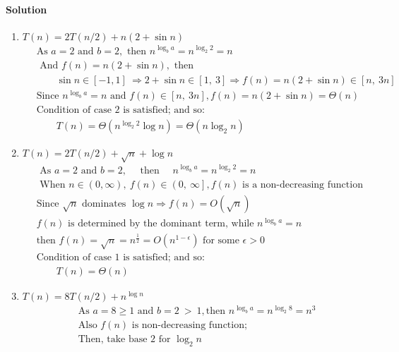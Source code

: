 \documentclass[a4paper]{scrartcl}
\begin{document}
\paragraph{Solution}
\begin{enumerate}[label=(\alph*)]
  \item $T (n) = 2T (n/2) + n(2 + \sin{n})$
\begin{align*}
  &\ \text{As }a = 2\text{ and }b = 2,\text{ then }n^{\log_b{a}} = n^{\log_2{2}} = n\\
  &\ \text{ And }f(n) = n(2 + \sin{n}),\text{ then}\\ &\
  \qquad \sin{n} \in \left[-1, 1\right]\ \Rightarrow 2+\sin{n} \in \left[1,\ 3\right] \Rightarrow f(n) = n\left(2 + \sin{n}\right) \in \left[n,\ 3n\right]\\ &\
  \text{Since }n^{\log_b{a}} = n\text{ and }f(n) \in \left[n,\ 3n\right], f(n) = n(2 + \sin{n}) = \Theta(n)\\ &\
  \text{Condition of case 2 is satisfied; and so:}\\
  &\ \qquad T(n)=\Theta\left({n^{\log_2{2}}\log{n}}\right) =\Theta\left({n\log_2{n}}\right)
\end{align*}
\item $T (n) = 2T (n/2) + \sqrt{n} + \log{n}$
\begin{align*}
  &\ \text{ As }a = 2\text{ and }b = 2,\quad\text{ then }\quad n^{\log_b{a}} = n^{\log_2{2}} = n\\
  &\ \text{ When }n \in \left(0, \infty\right),\ f(n) \in \left(0,\ \infty\right], f(n)\text{ is a non-decreasing function}\\
  &\ \text{Since }\sqrt{n}\text{ dominates }\log{n} \Rightarrow f(n)=O(\sqrt{n}) \\ &\ 
  f(n)\text{ is determined by the dominant term, while }n^{\log_b{a}}=n\\ &\
  \text{then }f(n) = \sqrt{n}=n^{\frac{1}{2}}=O(n^{1-\epsilon})\text{ for some } \epsilon > 0\\ &\
  \text{Condition of case 1 is satisfied; and so:}\\
  &\ \qquad T(n)=\Theta(n)
\end{align*}
\item $T (n) = 8T (n/2) + n^{\log{n}}$
\begin{align*}
  &\ \text{As }a = 8\geq 1\text{ and }b = 2\ >\ 1,\text{then }n^{\log_b{a}} = n^{\log_2{8}} = n^3\\ &\
  \text{Also }f(n)\text{ is non-decreasing function;}\\ &\
   \text{Then, take base 2 for }\log_2{n}\\ &\ 

\end{align*}
\end{enumerate}
\end{document}
